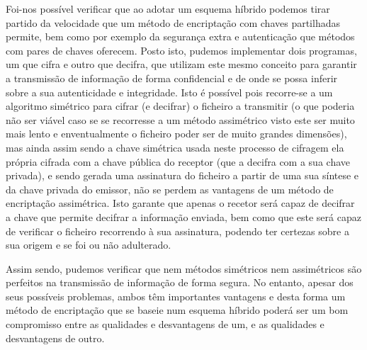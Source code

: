 \documentclass[a4paper,11pt,openright,oneside]{report}
\begin{document}
Foi-nos possível verificar que ao adotar um esquema híbrido podemos tirar partido da velocidade que um método de encriptação com chaves partilhadas permite, bem como por exemplo da segurança extra e autenticação que métodos com pares de chaves oferecem. Posto isto, pudemos implementar dois programas, um que cifra e outro que decifra, que utilizam este mesmo conceito para garantir a transmissão de informação de forma confidencial e de onde se possa inferir sobre a sua autenticidade e integridade. Isto é possível pois recorre-se a um algoritmo simétrico para cifrar (e decifrar) o ficheiro a transmitir (o que poderia não ser viável caso se se recorresse a um método assimétrico visto este ser muito mais lento e enventualmente o ficheiro poder ser de muito grandes dimensões), mas ainda assim sendo a chave simétrica usada neste processo de cifragem ela própria cifrada com a chave pública do receptor (que a decifra com a sua chave privada), e sendo gerada uma assinatura do ficheiro a partir de uma sua síntese e da chave privada do emissor, não se perdem as vantagens de um método de encriptação assimétrica. Isto garante que apenas o recetor será capaz de decifrar a chave que permite decifrar a informação enviada, bem como que este será capaz de verificar o ficheiro recorrendo à sua assinatura, podendo ter certezas sobre a sua origem e se foi ou não adulterado.

Assim sendo, pudemos verificar que nem métodos simétricos nem assimétricos são perfeitos na transmissão de informação de forma segura. No entanto, apesar dos seus possíveis problemas, ambos têm importantes vantagens e desta forma um método de encriptação que se baseie num esquema híbrido poderá ser um bom compromisso entre as qualidades e desvantagens de um, e as qualidades e desvantagens de outro. 

\newpage
\end{document}
